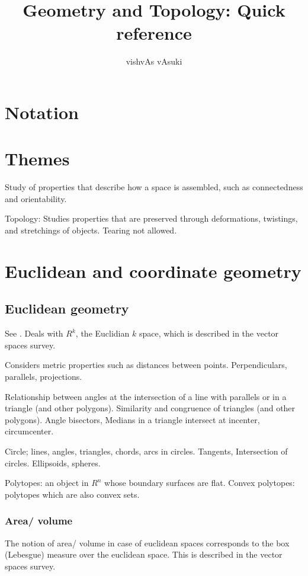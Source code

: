 \documentclass[oneside, article]{memoir}
\title{Geometry and Topology: Quick reference}
\author{vishvAs vAsuki}
\begin{document}
\maketitle

\part{Notation}


\part{Themes}
Study of properties that describe how a space is assembled, such as connectedness and orientability.

Topology: Studies properties that are preserved through deformations, twistings, and stretchings of objects. Tearing not allowed.

\part{Euclidean and coordinate geometry}
\chapter{Euclidean geometry}
See \cite{hallStevens}.
Deals with $R^{k}$, the Euclidian $k$ space, which is described in the vector spaces survey.

Considers metric properties such as distances between points. Perpendiculars, parallels, projections.

Relationship between angles at the intersection of a line with parallels or in a triangle (and other polygons). Similarity and congruence of triangles (and other polygons). Angle bisectors, Medians in a triangle intersect at incenter, circumcenter.

Circle; lines, angles, triangles, chords, arcs in circles. Tangents, Intersection of circles. Ellipsoids, spheres.

Polytopes: an object in $R^n$ whose boundary surfaces are flat. Convex polytopes: polytopes which are also convex sets.

\section{Area/ volume}
The notion of area/ volume in case of euclidean spaces corresponds to the box (Lebesgue) measure over the euclidean space. This is described in the vector spaces survey.
\end{document}
